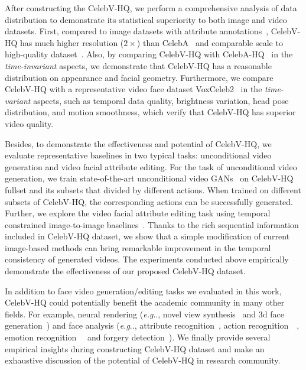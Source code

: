 \documentclass[runningheads]{llncs}
\makeatletter
\DeclareRobustCommand\onedot{\futurelet\@let@token\@onedot}
\def\@onedot{\ifx\@let@token.\else.\null\fi\xspace}
\def\eg{\emph{e.g}\onedot} \def\Eg{\emph{E.g}\onedot}
\makeatother
\begin{document}
After constructing the CelebV-HQ, we perform a comprehensive analysis of data distribution to demonstrate its statistical superiority to both image and video datasets. 
First, compared to image datasets with attribute annotations~\cite{celeba15,celebahq}, CelebV-HQ has much higher resolution ($2\times$) than CelebA~\cite{celeba15} and comparable scale to high-quality dataset~\cite{celebahq}. Also, by comparing CelebV-HQ with CelebA-HQ~\cite{celebahq} in the \textit{time-invariant} aspects, we demonstrate that CelebV-HQ has a reasonable distribution on appearance and facial geometry.
Furthermore, we compare CelebV-HQ with a representative video face dataset VoxCeleb2~\cite{vox2} in the \textit{time-variant} aspects, such as temporal data quality, brightness variation, head pose distribution, and motion smoothness, which verify that CelebV-HQ has superior video quality.



Besides, to demonstrate the effectiveness and potential of CelebV-HQ, we evaluate representative baselines in two typical tasks: unconditional video generation and video facial attribute editing.
For the task of unconditional video generation, we train state-of-the-art unconditional video GANs~\cite{mocoganhd,digan} on CelebV-HQ fullset and its subsets that divided by different actions. When trained on different subsets of CelebV-HQ, the corresponding actions can be successfully generated.
Further, we explore the video facial attribute editing task using temporal constrained image-to-image baselines~\cite{munit,starganv2}. Thanks to the rich sequential information included in CelebV-HQ dataset, we show that a simple modification of current image-based methods can bring remarkable improvement in the temporal consistency of generated videos. The experiments conducted above empirically demonstrate the effectiveness of our proposed CelebV-HQ dataset.


In addition to face video generation/editing tasks we evaluated in this work, CelebV-HQ could potentially benefit the academic community in many other fields. For example, neural rendering (\eg, novel view synthesis~\cite{headnerf,stylenerf,or2021stylesdf} and 3d face generation~\cite{chan2021pigan,or2021stylesdf,eg3d,guo2021adnerf,Gafni_2021_CVPR,chen2022sem2nerf}) and face analysis (\eg, attribute recognition~\cite{zhong2016face,ding2018deep,fairface}, action recognition~~\cite{wang2013action,jegham2020vision}, emotion recognition~~\cite{dzedzickis2020human,lee2019context} and forgery detection~\cite{li2020face,haliassos2021lips,zhu2021face}). We finally provide several empirical insights during constructing CelebV-HQ dataset and make an exhaustive discussion of the potential of CelebV-HQ in research community.
\end{document}
